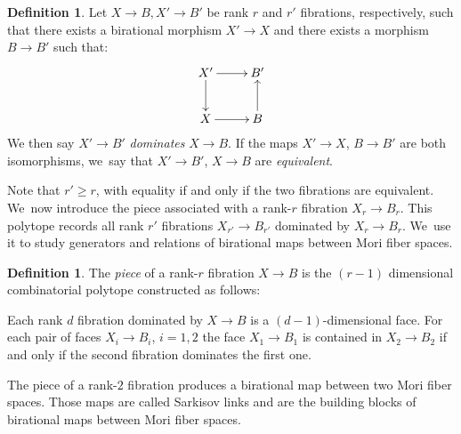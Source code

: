 \documentclass[10pt,a4paper]{amsart}
\theoremstyle{definition}
\newtheorem{definition}[theorem]{Definition}
\begin{document}
\begin{definition}
Let $ X \to B, X' \to B'$ be rank $r$ and $r'$ fibrations, respectively, such that there exists a birational morphism $X' \to X$ and there exists a morphism $B \to B'$ such that:
\[
\xymatrix{X' \ar[r] \ar[d] & B' \\ X \ar[r] & B \ar[u] }
\]
We then say $X' \to B'$ \emph{dominates} $X \to B$. If the maps $X' \to X$, $B\to B'$ are both isomorphisms, we~say that $X' \to B'$, $X \to B$ are \emph{equivalent}.
\end{definition}
Note that $r' \geq r$, with equality if and only if the two fibrations are equivalent. We~now introduce the piece associated with a rank-$r$ fibration $X_r \to B_r$. This polytope records all rank $r'$ fibrations $X_{r'} \to B_{r'}$ dominated by $X_r \to B_r$. We~use it to study generators and relations of birational maps between Mori fiber spaces.

\begin{definition} \label{RPiece}
The \emph{piece} of a rank-$r$ fibration $X \to B$ is the $(r-1)$ dimensional combinatorial polytope constructed as follows:

Each rank $d$ fibration dominated by $X \to B$ is a $(d-1)$-dimensional face. For each pair of faces $X_i \to B_i$, $i=1,2$ the face $X_1 \to B_1$ is contained in $X_2 \to B_2$ if and only if the second fibration dominates the first one.
\end{definition}
The piece of a rank-$2$ fibration produces a birational map between two Mori fiber spaces. Those maps are called Sarkisov links and are the building blocks of birational maps between Mori fiber spaces.
\end{document}
